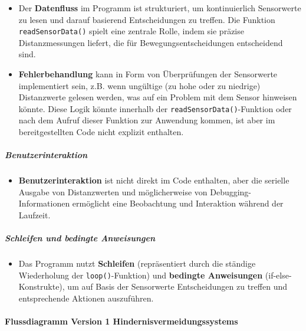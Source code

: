 \documentclass{vorlage-design-main}
\begin{document}
\begin{itemize}

\item
  Der \textbf{Datenfluss} im Programm ist strukturiert, um
  kontinuierlich Sensorwerte zu lesen und darauf basierend
  Entscheidungen zu treffen. Die Funktion
  \verb|readSensorData()| spielt eine zentrale Rolle,
  indem sie präzise Distanzmessungen liefert, die für
  Bewegungsentscheidungen entscheidend sind.
\item
  \textbf{Fehlerbehandlung} kann in Form von Überprüfungen der
  Sensorwerte implementiert sein, z.B. wenn ungültige (zu hohe oder zu
  niedrige) Distanzwerte gelesen werden, was auf ein Problem mit dem
  Sensor hinweisen könnte. Diese Logik könnte innerhalb der
  \verb|readSensorData()|-Funktion oder nach dem
  Aufruf dieser Funktion zur Anwendung kommen, ist aber im
  bereitgestellten Code nicht explizit enthalten.
\end{itemize}

\hypertarget{benutzerinteraktion}{%
\subparagraph{Benutzerinteraktion}\label{benutzerinteraktion}}

\begin{itemize}

\item
  \textbf{Benutzerinteraktion} ist nicht direkt im Code enthalten, aber
  die serielle Ausgabe von Distanzwerten und möglicherweise von
  Debugging-Informationen ermöglicht eine Beobachtung und Interaktion
  während der Laufzeit.
\end{itemize}

\hypertarget{schleifen-und-bedingte-anweisungen}{%
\subparagraph{Schleifen und bedingte
Anweisungen}\label{schleifen-und-bedingte-anweisungen}}

\begin{itemize}

\item
  Das Programm nutzt \textbf{Schleifen} (repräsentiert durch die
  ständige Wiederholung der \verb|loop()|-Funktion)
  und \textbf{bedingte Anweisungen} (if-else-Konstrukte), um auf Basis
  der Sensorwerte Entscheidungen zu treffen und entsprechende Aktionen
  auszuführen.
\end{itemize}

\newpage

\hypertarget{flussdiagramm-version-1-hindernisvermeidungssystems}{%
\paragraph{Flussdiagramm Version 1
Hindernisvermeidungssystems}\label{flussdiagramm-version-1-hindernisvermeidungssystems}}
\end{document}
